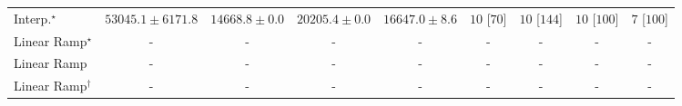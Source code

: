 \begin{tabular}{l|cccc|cccc|}
Interp.$^\star$ & {\cellcolor[HTML]{1E8041}} \color[HTML]{F1F1F1} $53045.1\pm 6171.8$ & {\cellcolor[HTML]{FAFDC9}} \color[HTML]{000000} $14668.8\pm 0.0$ & {\cellcolor[HTML]{EAF7AF}} \color[HTML]{000000} $20205.4\pm 0.0$ & {\cellcolor[HTML]{F8FCBD}} \color[HTML]{000000} $16647.0\pm 8.6$ & {\cellcolor[HTML]{49006A}} \color[HTML]{F1F1F1} $10$ [$70$] & {\cellcolor[HTML]{49006A}} \color[HTML]{F1F1F1} $10$ [$144$] & {\cellcolor[HTML]{49006A}} \color[HTML]{F1F1F1} $10$ [$100$] & {\cellcolor[HTML]{CD238F}} \color[HTML]{F1F1F1} $7$ [$100$] \\
Linear Ramp$^\star$ & {\cellcolor[HTML]{000000}} \color[HTML]{F1F1F1} {\cellcolor{white}} \color{black} - & {\cellcolor[HTML]{000000}} \color[HTML]{F1F1F1} {\cellcolor{white}} \color{black} - & {\cellcolor[HTML]{000000}} \color[HTML]{F1F1F1} {\cellcolor{white}} \color{black} - & {\cellcolor[HTML]{000000}} \color[HTML]{F1F1F1} {\cellcolor{white}} \color{black} - & {\cellcolor[HTML]{000000}} \color[HTML]{F1F1F1} {\cellcolor{white}} \color{black} - & {\cellcolor[HTML]{000000}} \color[HTML]{F1F1F1} {\cellcolor{white}} \color{black} - & {\cellcolor[HTML]{000000}} \color[HTML]{F1F1F1} {\cellcolor{white}} \color{black} - & {\cellcolor[HTML]{000000}} \color[HTML]{F1F1F1} {\cellcolor{white}} \color{black} - \\
Linear Ramp & {\cellcolor[HTML]{000000}} \color[HTML]{F1F1F1} {\cellcolor{white}} \color{black} - & {\cellcolor[HTML]{000000}} \color[HTML]{F1F1F1} {\cellcolor{white}} \color{black} - & {\cellcolor[HTML]{000000}} \color[HTML]{F1F1F1} {\cellcolor{white}} \color{black} - & {\cellcolor[HTML]{000000}} \color[HTML]{F1F1F1} {\cellcolor{white}} \color{black} - & {\cellcolor[HTML]{000000}} \color[HTML]{F1F1F1} {\cellcolor{white}} \color{black} - & {\cellcolor[HTML]{000000}} \color[HTML]{F1F1F1} {\cellcolor{white}} \color{black} - & {\cellcolor[HTML]{000000}} \color[HTML]{F1F1F1} {\cellcolor{white}} \color{black} - & {\cellcolor[HTML]{000000}} \color[HTML]{F1F1F1} {\cellcolor{white}} \color{black} - \\
Linear Ramp$^\dagger$ & {\cellcolor[HTML]{000000}} \color[HTML]{F1F1F1} {\cellcolor{white}} \color{black} - & {\cellcolor[HTML]{000000}} \color[HTML]{F1F1F1} {\cellcolor{white}} \color{black} - & {\cellcolor[HTML]{000000}} \color[HTML]{F1F1F1} {\cellcolor{white}} \color{black} - & {\cellcolor[HTML]{000000}} \color[HTML]{F1F1F1} {\cellcolor{white}} \color{black} - & {\cellcolor[HTML]{000000}} \color[HTML]{F1F1F1} {\cellcolor{white}} \color{black} - & {\cellcolor[HTML]{000000}} \color[HTML]{F1F1F1} {\cellcolor{white}} \color{black} - & {\cellcolor[HTML]{000000}} \color[HTML]{F1F1F1} {\cellcolor{white}} \color{black} - & {\cellcolor[HTML]{000000}} \color[HTML]{F1F1F1} {\cellcolor{white}} \color{black} - \\

\end{tabular}
